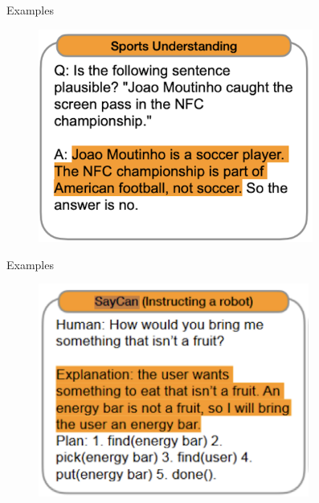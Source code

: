 \begin{vbframe}{Examples}

\vfill

\begin{figure}
    \centering
    \includegraphics[height=7cm]{figure/cotex3.png}
\end{figure}

\vfill

\end{vbframe}

\begin{vbframe}{Examples}

\vfill

\begin{figure}
    \centering
    \includegraphics[height=7cm]{figure/cotex4.png}
\end{figure}

\vfill

\end{vbframe}

